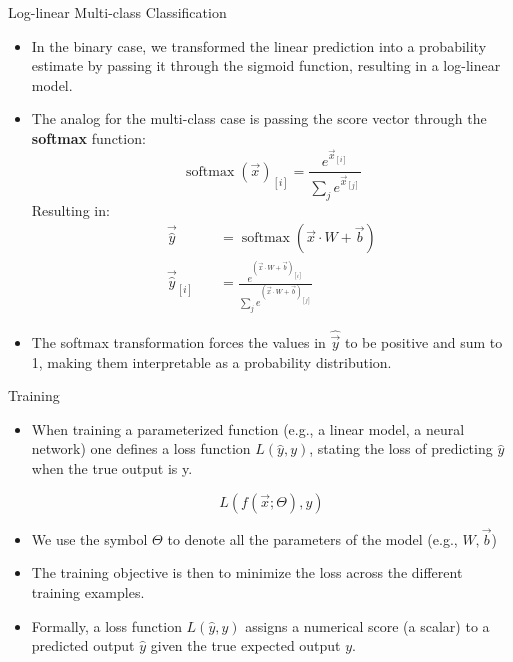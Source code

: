 \documentclass[handout]{beamer}
\begin{document}
\begin{frame}{Log-linear Multi-class Classification}

\begin{scriptsize}
\begin{itemize}
\item In the binary case, we transformed the linear prediction into a probability estimate by passing it through the sigmoid function, resulting in a log-linear model.
\item The analog for the multi-class case is passing the score vector through the \textbf{softmax} function:
\begin{equation}
 \operatorname{softmax}(\vec{x})_{[i]} = \frac{e^{\vec{x}_{[i]}}}{\sum_j e^{\vec{x}_{[j]}}}
\end{equation}
Resulting in:
\begin{equation}
\begin{split}
\vec{\hat{y}} \quad & =  \operatorname{softmax}(\vec{x} \cdot W + \vec{b})  \\
\vec{\hat{y}}_{[i]} \quad & = \frac{e^{(\vec{x} \cdot W + \vec{b})_{[i]}}}{\sum_j e^{(\vec{x} \cdot W + \vec{b})_{[j]}}}
\end{split}
\end{equation}
\item The softmax transformation forces the values in $\hat{\vec{y}}$ to be positive and sum to 1, making them interpretable as a probability distribution.
\end{itemize}
\end{scriptsize}
\end{frame}





\begin{frame}{Training}
\begin{scriptsize}
\begin{itemize}
\item  When training a parameterized function (e.g., a linear model, a neural network) one defines a loss function $L(\hat{y}, y)$, stating the loss of predicting $\hat{y}$ when the true output is y.

\begin{displaymath}
L(f(\vec{x};\Theta), y) 
\end{displaymath}

\item We use the symbol $\Theta$ to denote all the parameters of the model (e.g.,  $W, \vec{b}$)

\item The training objective is then to minimize the loss across the different training examples. 


\item Formally, a loss function $L(\hat{y},y)$ assigns a numerical score (a scalar) to a predicted output $\hat{y}$ given the true expected output $y$. 

\end{itemize}
\end{scriptsize}
\end{frame}
\end{document}
